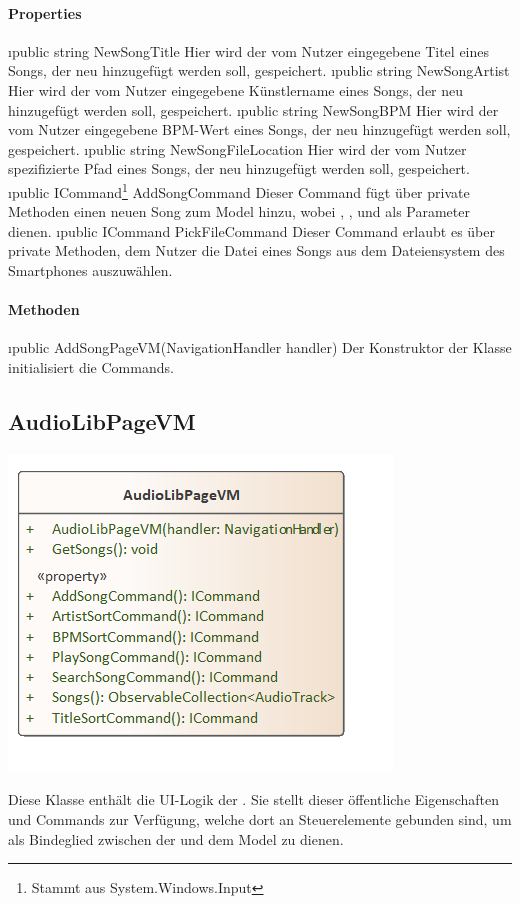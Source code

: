 \documentclass[../entwurf.tex]{subfiles}
\begin{document}
\paragraph{Properties}
\begin{itemize}
	\i{public string NewSongTitle} Hier wird der vom Nutzer eingegebene Titel eines Songs, der neu hinzugefügt werden soll, gespeichert.
	\i{public string NewSongArtist} Hier wird der vom Nutzer eingegebene Künstlername eines Songs, der neu hinzugefügt werden soll, gespeichert.
	\i{public string NewSongBPM} Hier wird der vom Nutzer eingegebene BPM-Wert eines Songs, der neu hinzugefügt werden soll, gespeichert.
	\i{public string NewSongFileLocation} Hier wird der vom Nutzer spezifizierte Pfad eines Songs, der neu hinzugefügt werden soll, gespeichert.
	\i{public ICommand\footnote{Stammt aus System.Windows.Input} AddSongCommand} Dieser Command fügt über private Methoden einen neuen Song zum Model hinzu, wobei , ,  und  als Parameter dienen. 
	\i{public ICommand PickFileCommand} Dieser Command erlaubt es über private Methoden, dem Nutzer die Datei eines Songs aus dem Dateiensystem des Smartphones auszuwählen. 
\end{itemize}
\paragraph{Methoden}
\begin{itemize}
	\i{public AddSongPageVM(NavigationHandler handler)} Der Konstruktor der Klasse initialisiert die Commands.
\end{itemize}
\subsection{AudioLibPageVM}
\begin{minipage}{0.5\textwidth}
\includegraphics[scale=0.75]{../graphics/vm_klassen/AudioLibPageVM.png}
\end{minipage}
\begin{minipage}{0.5\textwidth}
Diese Klasse enthält die UI-Logik der . Sie stellt dieser öffentliche Eigenschaften und Commands zur Verfügung, welche dort an Steuerelemente gebunden sind, um als Bindeglied zwischen der  und dem Model zu dienen.
\end{minipage}
\end{document}
